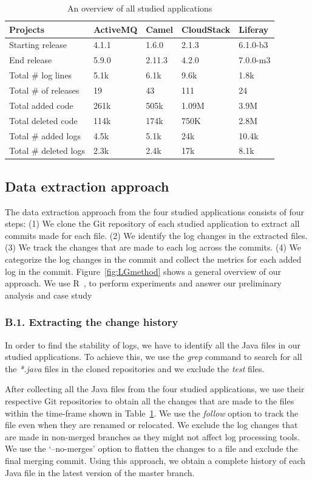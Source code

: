 \begin{table}[tb]
	\centering \protect\protect\caption{An overview of all studied applications}
	
	
	\label{tba:overviewsystems} %
	\begin{tabular}{lllll}
		\hline 
		Projects  & ActiveMQ  & Camel  & CloudStack  & Liferay \tabularnewline
		\hline 
		Starting release  & 4.1.1  & 1.6.0  & 2.1.3  & 6.1.0-b3 \tabularnewline
		End release  & 5.9.0  & 2.11.3  & 4.2.0  & 7.0.0-m3 \tabularnewline
		Total \# log lines  & 5.1k  & 6.1k  & 9.6k  & 1.8k \tabularnewline
		Total \# of releases  & 19  & 43  & 111  & 24 \tabularnewline
		Total added code  & 261k  & 505k  & 1.09M  & 3.9M \tabularnewline
		Total deleted code  & 114k  & 174k  & 750K  & 2.8M \tabularnewline
		Total \# added logs  & 4.5k  & 5.1k  & 24k  & 10.4k \tabularnewline
		Total \# deleted logs  & 2.3k  & 2.4k  & 17k  & 8.1k \tabularnewline
		\hline 
	\end{tabular}
\end{table}

\subsection{Data extraction approach}

The data extraction approach from the four studied applications consists of four steps: (1) We clone the Git repository of each studied application to extract all commits made for each file. (2) We identify the log changes in the extracted files. (3) We track the changes that are made to each log across the commits. (4) We categorize the log changes in the commit and collect the metrics for each added log in the commit.
Figure~\ref{fig:LGmethod} shows a general overview of our approach. We use R~\cite{ihaka1996r}, to perform experiments and answer our preliminary analysis and case study


\subsubsection*{B.1. Extracting the change history} 
In order to find the stability of logs, we have to identify all the Java files in our studied applications. To achieve this, we use the \emph{grep} command to search for all the \emph{*.java} files in the cloned repositories and we exclude the \emph{test} files. 

After collecting all the Java files from the four studied applications, we use their respective Git repositories to obtain all the changes that are made to the files within the time-frame shown in Table~\ref{tba:overviewsystems}. We use the \emph{follow} option to track the file even when they are renamed or relocated. We exclude the log changes that are made in non-merged branches as they might not affect log processing tools. We use the `--no-merges' option to flatten the changes to a file and exclude the final merging commit. Using this approach, we obtain a complete history of each Java file in the latest version of the master branch.


